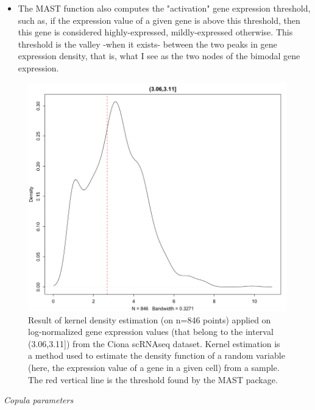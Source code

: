\documentclass{report}
\begin{document}
{\begin{itemize}
Hence the values on which the regression will be performed are the following weighted mean values: if C is the set of cells, and G the set of genes, the value associated with a given gene $g$ is: $\sum{_{j \in C} \frac{M[g, j]}{\sum{_{k \in G} M[k, j]}}}$.
\item The MAST function also computes the "activation" gene expression threshold, such as, if the expression value of a given gene is above this threshold, then this gene is considered highly-expressed, mildly-expressed otherwise. This threshold is the valley -when it exists- between the two peaks in gene expression density, that is, what I see as the two nodes of the bimodal gene expression.
\end{itemize}

\begin{figure}[H]
\centering
\includegraphics[scale=0.35]{illustrations/densityCionaLogNorm.png}
\caption{Result of kernel density estimation\cite{parzen1962estimation} (on n=846 points) applied on log-normalized gene expression values (that belong to the interval (3.06,3.11]) from the Ciona\cite{suyama2016singlecell} scRNAseq dataset. Kernel estimation is a method used to estimate the density function of a random variable (here, the expression value of a gene in a given cell) from a sample. The red vertical line is the threshold found by the MAST package.}
\label{densityCiona2}
\end{figure}

\bigskip
\noindent \textit{Copula parameters}
\bigskip

}
\end{document}
